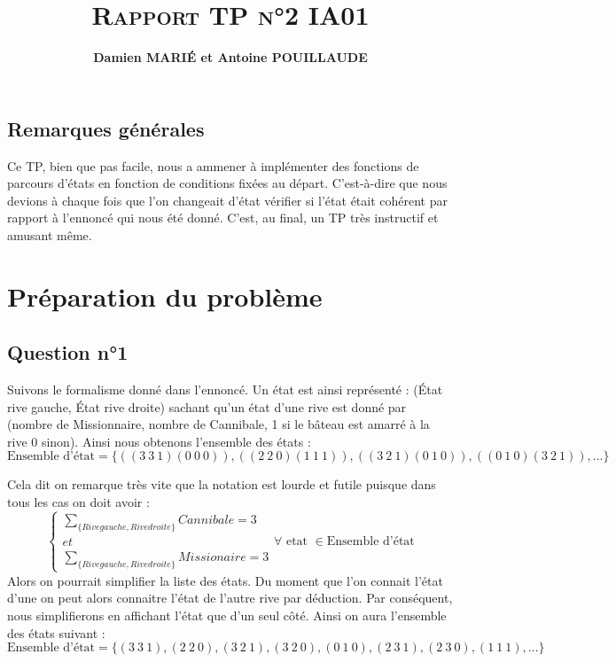 \documentclass[a4paper, 12pt, leqno]{report}
\title{\textsc{\textbf{Rapport TP n°2 IA01}}}
\author{\textbf{Damien MARI\'E et Antoine POUILLAUDE}}
\theoremstyle{plain}
\begin{document}
    \maketitle
    \tableofcontents
\newpage
\section*{Remarques générales}
		Ce TP, bien que pas facile, nous a ammener à implémenter des fonctions de parcours d'états en fonction de conditions fixées au départ. C'est-à-dire que nous devions à chaque fois que l'on changeait d'état vérifier si l'état était cohérent par rapport à l'ennoncé qui nous été donné. C'est, au final, un TP très instructif et amusant même.
        \chapter{Préparation du problème}  
        \section{Question n°1}      
            Suivons le formalisme donné dans l'ennoncé. Un état est ainsi représenté : (État rive gauche, État rive droite) sachant qu'un état d'une rive est donné par (nombre de Missionnaire, nombre de Cannibale, 1 si le bâteau est amarré à la rive 0 sinon). Ainsi nous obtenons l'ensemble des états : 
            \[ \text{Ensemble d'état} = 
            \{ ((3\ 3\ 1) (0\ 0\ 0)),
            ((2\ 2\ 0) (1\ 1\ 1)),
            ((3\ 2\ 1) (0\ 1\ 0)),
            ((0\ 1\ 0) (3\ 2\ 1)),
            ...
            \}\]
            
    Cela dit on remarque très vite que la notation est lourde et futile puisque dans tous les cas on doit avoir : 
\[
          \left\{
    \begin{array}{ll}
        \sum_{\{Rive gauche,Rive droite\}}^{}Cannibale =3\\
        et\\
        \sum_{\{Rive gauche,Rive droite\}}^{}Missionaire = 3
    \end{array}
\right.
\forall \text{ etat } \in \text{Ensemble d'état}
\]
Alors on pourrait simplifier la liste des états. Du moment que l'on connait l'état d'une on peut alors connaitre l'état de l'autre rive par déduction. Par conséquent, nous simplifierons en affichant l'état que d'un seul côté. Ainsi on aura l'ensemble des états suivant :
\[ \text{Ensemble d'état} = 
            \{ (3\ 3\ 1),
            (2\ 2\ 0),
            (3\ 2\ 1),
            (3\ 2\ 0),
            (0\ 1\ 0),
            (2\ 3\ 1),
            (2\ 3\ 0),
            (1\ 1\ 1),
            ...
            \}\]
\end{document}
